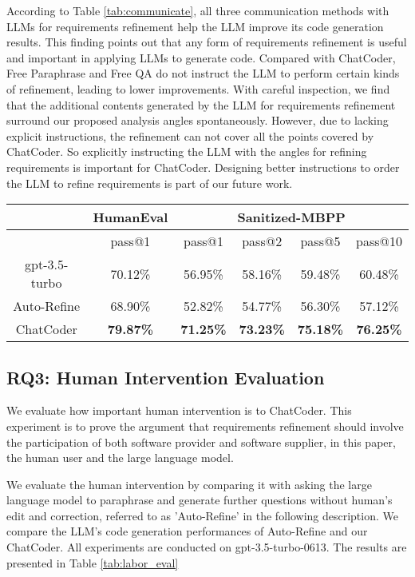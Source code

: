 \documentclass[sigconf]{acmart}
\begin{document}
According to Table \ref{tab:communicate}, all three communication methods with LLMs for requirements refinement help the LLM improve its code generation results. This finding points out that any form of requirements refinement is useful and important in applying LLMs to generate code. Compared with ChatCoder, Free Paraphrase and Free QA do not instruct the LLM to perform certain kinds of refinement, leading to lower improvements. With careful inspection, we find that the additional contents generated by the LLM for requirements refinement surround our proposed analysis angles spontaneously. However, due to lacking explicit instructions, the refinement can not cover all the points covered by ChatCoder. So explicitly instructing the LLM with the angles for refining requirements is important for ChatCoder. Designing better instructions to order the LLM to refine requirements is part of our future work.

\begin{table*}[htbp]
    \centering
    \caption{Human Intervention Evaluation}
     \begin{tabular}{c c | c  c  c c}
    \toprule
     & HumanEval & \multicolumn{4}{c}{Sanitized-MBPP} \\
     \midrule
     & pass@1 & pass@1 & pass@2 & pass@5 & pass@10\\
     \midrule
     gpt-3.5-turbo & 70.12\% & 56.95\% & 58.16\% & 59.48\% & 60.48\% \\
     \midrule
     Auto-Refine & 68.90\% & 52.82\% & 54.77\% & 56.30\% & 57.12\% \\
     ChatCoder & \textbf{79.87\%} &\textbf{ 71.25\%} & \textbf{73.23\%} & \textbf{75.18\%} & \textbf{76.25\%} \\
     \bottomrule
    \end{tabular}
    
    \label{tab:labor_eval}
\end{table*}

\subsection{RQ3: Human Intervention Evaluation}
We evaluate how important human intervention is to ChatCoder. This experiment is to prove the argument that requirements refinement should involve the participation of both software provider and software supplier, in this paper, the human user and the large language model.

We evaluate the human intervention by comparing it with asking the large language model to paraphrase and generate further questions without human's edit and correction, referred to as 'Auto-Refine' in the following description. We compare the LLM's code generation performances of Auto-Refine and our ChatCoder. All experiments are conducted on gpt-3.5-turbo-0613. The results are presented in Table \ref{tab:labor_eval}
\end{document}
